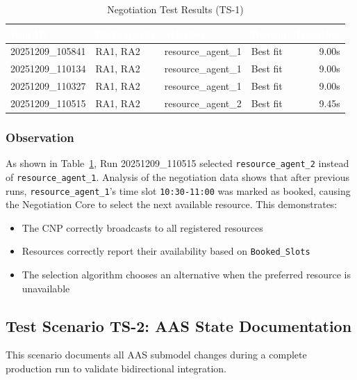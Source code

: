 \begin{table}[ht]
\centering
\caption{Negotiation Test Results (TS-1)}
\label{tab:negotiation_results}
\begin{tabular}{llllr}
\toprule
\rowcolor{headerblue}
\textcolor{white}{Run ID} & \textcolor{white}{Participants} & \textcolor{white}{Selected} & \textcolor{white}{Reason} & \textcolor{white}{Duration} \\
\midrule
20251209\_105841 & RA1, RA2 & resource\_agent\_1 & Best fit & 9.00s \\
\rowcolor{lightgray}
20251209\_110134 & RA1, RA2 & resource\_agent\_1 & Best fit & 9.00s \\
20251209\_110327 & RA1, RA2 & resource\_agent\_1 & Best fit & 9.00s \\
\rowcolor{lightgray}
20251209\_110515 & RA1, RA2 & resource\_agent\_2 & Best fit & 9.45s \\
\bottomrule
\end{tabular}
\end{table}

\subsubsection{Observation}

As shown in Table~\ref{tab:negotiation_results}, Run 20251209\_110515 selected \texttt{resource\_agent\_2} instead of \texttt{resource\_agent\_1}. Analysis of the negotiation data shows that after previous runs, \texttt{resource\_agent\_1}'s time slot \texttt{10:30-11:00} was marked as booked, causing the Negotiation Core to select the next available resource. This demonstrates:

\begin{itemize}
    \item The CNP correctly broadcasts to all registered resources
    \item Resources correctly report their availability based on \texttt{Booked\_Slots}
    \item The selection algorithm chooses an alternative when the preferred resource is unavailable
\end{itemize}

\subsection{Test Scenario TS-2: AAS State Documentation}
\label{subsec:ts2_aas_state}

This scenario documents all \ac{AAS} submodel changes during a complete production run to validate bidirectional integration.

